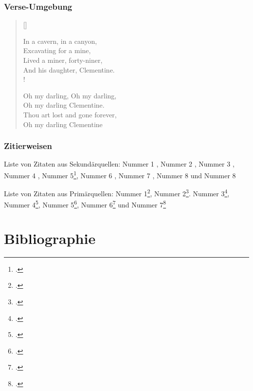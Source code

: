 \documentclass[12pt]{scrreprt}
\begin{document}
\subsection{Verse-Umgebung}
\settowidth{\versewidth}{In a cavern, in a canyon,}
\begin{verse}[\versewidth]
\begin{altverse}
 In a cavern, in a canyon, \\
Excavating for a mine, \\
Lived a miner, forty-niner, \label{vs:49} \\
And his daughter, Clementine. \\!
\end{altverse}

\begin{altverse}
 Oh my darling, Oh my darling, \\
Oh my darling Clementine. \\
Thou art lost and gone forever, \\
Oh my darling Clementine
\end{altverse}

\end{verse}
\subsection{Zitierweisen}
Liste von Zitaten aus Sekundärquellen: Nummer 1 \parencite[][56-59]{Culler1997}, Nummer 2 \parencite[][103]{Baugh2002} , Nummer 3 \cite*[][]{Schabert2000}, Nummer 4 \Cite[][]{Crenshaw1995} , Nummer 5\footcite[][2: 117]{Huehn1995}, Nummer 6 \textcite[][290-297]{Kastovsky1992}, Nummer 7 \parencite[][587]{Wimsatt1959},  Nummer 8 \parencite[][5]{Jones1989} und Nummer 8 \parencite{Willey2003}

Liste von Zitaten aus Primärquellen: Nummer 1\footcite[][35]{Banville2005}, Nummer 2\footcite[][56]{Austen1813}. Nummer 3\footcite[][72]{Wrenn1996}, Nummer 4\footcite[][117]{McEwan1975}, Nummer 5\footcite[][1. 11-16]{Eliot2000}, Nummer 6\footcite[][1.5.189-190]{Shakespeare1985} und Nummer 7\footcite[][1:14:12]{Coppola1992}
\chapter{Bibliographie}
\printbibliography[keyword=Primaerquelle,heading=subbibliography,title={Primärquellen}]
\printbibliography[keyword=Sekundaerquelle,heading=subbibliography,title={Sekundärquellen}]
\end{document}
